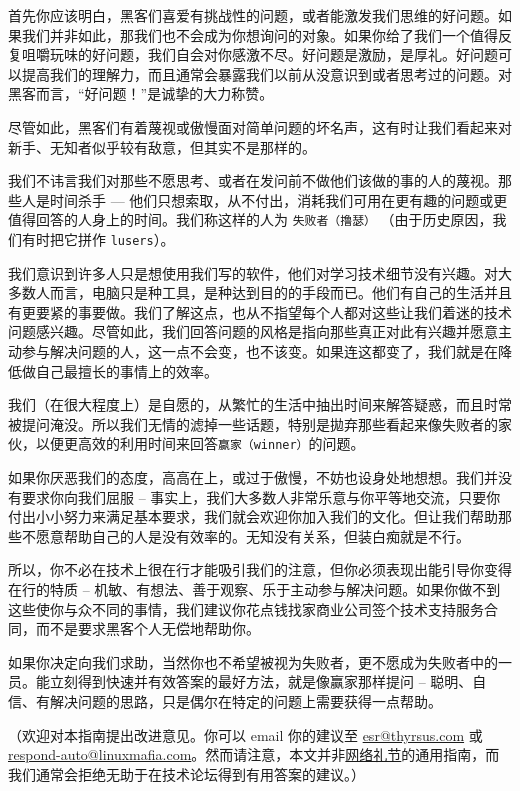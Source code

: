\documentclass[titlepage]{article}
\begin{document}
首先你应该明白，黑客们喜爱有挑战性的问题，或者能激发我们思维的好问题。如果我们并非如此，那我们也不会成为你想询问的对象。如果你给了我们一个值得反复咀嚼玩味的好问题，我们自会对你感激不尽。好问题是激励，是厚礼。好问题可以提高我们的理解力，而且通常会暴露我们以前从没意识到或者思考过的问题。对黑客而言，``好问题！''是诚挚的大力称赞。

尽管如此，黑客们有着蔑视或傲慢面对简单问题的坏名声，这有时让我们看起来对新手、无知者似乎较有敌意，但其实不是那样的。

我们不讳言我们对那些不愿思考、或者在发问前不做他们该做的事的人的蔑视。那些人是时间杀手
---
他们只想索取，从不付出，消耗我们可用在更有趣的问题或更值得回答的人身上的时间。我们称这样的人为
\texttt{失败者（撸瑟）} （由于历史原因，我们有时把它拼作
\texttt{lusers}）。

我们意识到许多人只是想使用我们写的软件，他们对学习技术细节没有兴趣。对大多数人而言，电脑只是种工具，是种达到目的的手段而已。他们有自己的生活并且有更要紧的事要做。我们了解这点，也从不指望每个人都对这些让我们着迷的技术问题感兴趣。尽管如此，我们回答问题的风格是指向那些真正对此有兴趣并愿意主动参与解决问题的人，这一点不会变，也不该变。如果连这都变了，我们就是在降低做自己最擅长的事情上的效率。

我们（在很大程度上）是自愿的，从繁忙的生活中抽出时间来解答疑惑，而且时常被提问淹没。所以我们无情的滤掉一些话题，特别是拋弃那些看起来像失败者的家伙，以便更高效的利用时间来回答\texttt{赢家（winner）}的问题。

如果你厌恶我们的态度，高高在上，或过于傲慢，不妨也设身处地想想。我们并没有要求你向我们屈服
--
事实上，我们大多数人非常乐意与你平等地交流，只要你付出小小努力来满足基本要求，我们就会欢迎你加入我们的文化。但让我们帮助那些不愿意帮助自己的人是没有效率的。无知没有关系，但装白痴就是不行。

所以，你不必在技术上很在行才能吸引我们的注意，但你必须表现出能引导你变得在行的特质
--
机敏、有想法、善于观察、乐于主动参与解决问题。如果你做不到这些使你与众不同的事情，我们建议你花点钱找家商业公司签个技术支持服务合同，而不是要求黑客个人无偿地帮助你。

如果你决定向我们求助，当然你也不希望被视为失败者，更不愿成为失败者中的一员。能立刻得到快速并有效答案的最好方法，就是像赢家那样提问
--
聪明、自信、有解决问题的思路，只是偶尔在特定的问题上需要获得一点帮助。

（欢迎对本指南提出改进意见。你可以 email 你的建议至
\url{esr@thyrsus.com} 或
\url{respond-auto@linuxmafia.com}。然而请注意，本文并非\href{http://www.ietf.org/rfc/rfc1855.txt}{网络礼节}的通用指南，而我们通常会拒绝无助于在技术论坛得到有用答案的建议。）
\end{document}
